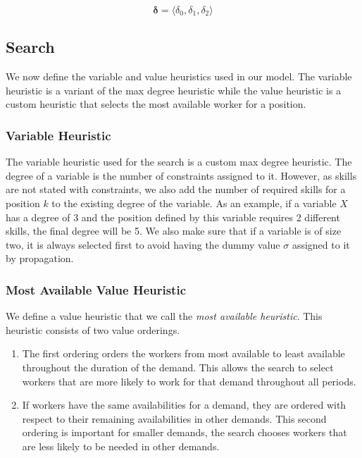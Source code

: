 \documentclass[../../thesis.tex]{subfiles}
\begin{document}
\begin{equation}
  \label{penalties:cp}
  \bm{\delta} = \langle\delta_0, \delta_1, \delta_2\rangle
\end{equation}




\subsection{Search}

We now define the variable and value heuristics used in our model. The variable heuristic is a variant of the 
max degree heuristic while the value heuristic is a custom heuristic that selects the most available worker for a position.

\subsubsection{Variable Heuristic}

The variable heuristic used for the search is a custom max degree heuristic. 
The degree of a variable is the number of constraints assigned to it. However, as skills are not stated with constraints, 
we also add the number of required skills for a position $k$ to the existing degree of the variable. 
As an example, if a variable $X$ has a degree of 3 and the position defined by this variable requires 2 different skills, the final degree will be 5.
We also make sure that if a variable is of size two, it is always selected first to avoid having the dummy value $\sigma$ assigned to it by 
propagation.


\subsubsection{Most Available Value Heuristic}

We define a value heuristic that we call the \emph{most available heuristic}. 
This heuristic consists of two value orderings.
\begin{enumerate}
  \item The first ordering orders the workers from most available to least available throughout the duration of the demand.
        This allows the search to select workers that are more likely to work for that demand throughout all periods.
  \item If workers have the same availabilities for a demand, they are ordered with respect to their remaining availabilities in other demands. This 
        second ordering is important for smaller demands, the search chooses workers that are less likely to be needed in other demands.
\end{enumerate}
\end{document}
